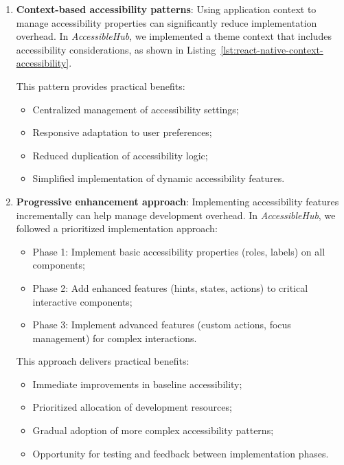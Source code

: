 \begin{enumerate}
    \item \textbf{Context-based accessibility patterns}: Using application context to manage accessibility properties can significantly reduce implementation overhead. In \textit{AccessibleHub}, we implemented a theme context that includes accessibility considerations, as shown in Listing~\ref{lst:react-native-context-accessibility}.
    
    This pattern provides practical benefits:
    \begin{itemize}
        \item Centralized management of accessibility settings;
        \item Responsive adaptation to user preferences;
        \item Reduced duplication of accessibility logic;
        \item Simplified implementation of dynamic accessibility features.
    \end{itemize}
    
    \item \textbf{Progressive enhancement approach}: Implementing accessibility features incrementally can help manage development overhead. In \textit{AccessibleHub}, we followed a prioritized implementation approach:
    \begin{itemize}
        \item Phase 1: Implement basic accessibility properties (roles, labels) on all components;
        \item Phase 2: Add enhanced features (hints, states, actions) to critical interactive components;
        \item Phase 3: Implement advanced features (custom actions, focus management) for complex interactions.
    \end{itemize}
    
    This approach delivers practical benefits:
    \begin{itemize}
        \item Immediate improvements in baseline accessibility;
        \item Prioritized allocation of development resources;
        \item Gradual adoption of more complex accessibility patterns;
        \item Opportunity for testing and feedback between implementation phases.
    \end{itemize}
\end{enumerate}

